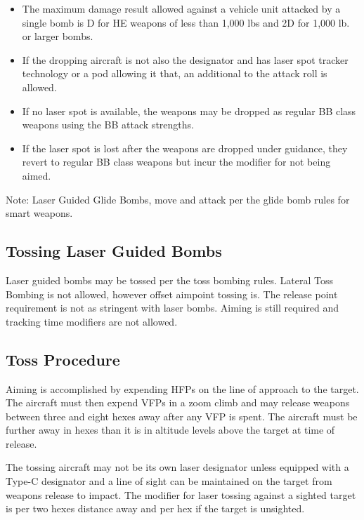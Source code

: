 \begin{itemize}

\item The maximum damage result allowed against a vehicle unit attacked by a single bomb is D for HE weapons of less than 1,000 lbs and 2D for 1,000 lb. or larger bombs.

\item If the dropping aircraft is not also the designator and has laser spot tracker technology or a pod allowing it that, an additional  to the attack roll is allowed.

\item If no laser spot is available, the weapons may be dropped as regular BB class weapons using the BB attack strengths.

\item {}If the laser spot is lost after the weapons are dropped under guidance, they revert to regular BB class weapons but incur the  modifier for not being aimed.

\end{itemize}

Note: Laser Guided Glide Bombs, move and attack per the glide bomb rules for smart weapons.

\subsection{Tossing Laser Guided Bombs} Laser guided bombs may be tossed per the toss bombing rules. Lateral Toss Bombing is not allowed, however offset aimpoint tossing is. The release point requirement is not as stringent with laser bombs. Aiming is still required and tracking time modifiers are not allowed.

\subsection{Toss Procedure} Aiming is accomplished by expending HFPs on the line of approach to the target. The aircraft must then expend VFPs in a zoom climb and may release weapons between three and eight hexes away after any VFP is spent. The aircraft must be further away in hexes than it is in altitude levels above the target at time of release.

The tossing aircraft may not be its own laser designator unless equipped with a Type-C designator and a line of sight can be maintained on the target from weapons release to impact. The modifier for laser tossing against a sighted target is  per two hexes distance away and  per hex if the target is unsighted.

